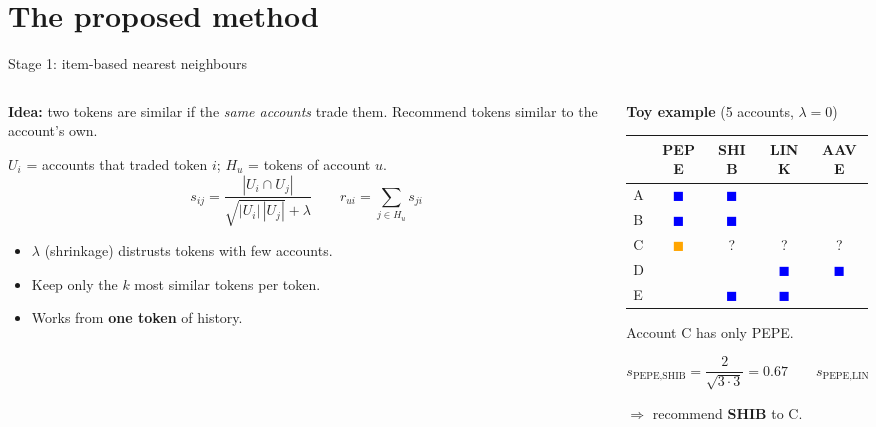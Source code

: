 \documentclass[aspectratio=169,10pt]{beamer}
\begin{document}
\section{The proposed method}

\begin{frame}{Stage 1: item-based nearest neighbours \cite{sarwar2001}}
  \begin{columns}[T]
    \begin{column}{0.46\textwidth}
      \small
      \textbf{Idea:} two tokens are similar if the \emph{same accounts} trade them.
      Recommend tokens similar to the account's own.
      \par\smallskip
      $U_i$ = accounts that traded token $i$; $H_u$ = tokens of account $u$.
      \[
        s_{ij} = \frac{|U_i \cap U_j|}{\sqrt{|U_i|\,|U_j|} + \lambda}
        \qquad
        r_{ui} = \sum_{j \in H_u} s_{ji}
      \]
      \begin{itemize}\footnotesize
        \item $\lambda$ (shrinkage) distrusts tokens with few accounts.
        \item Keep only the $k$ most similar tokens per token.
        \item Works from \textbf{one token} of history.
      \end{itemize}
    \end{column}
    \begin{column}{0.5\textwidth}
      \centering\footnotesize
      \textbf{Toy example} (5 accounts, $\lambda=0$)
      \par\smallskip
      \begin{tabular}{@{}lcccc@{}}
        \toprule
        & PEPE & SHIB & LINK & AAVE \\
        \midrule
        A & \textcolor{blue}{$\blacksquare$} & \textcolor{blue}{$\blacksquare$} & & \\
        B & \textcolor{blue}{$\blacksquare$} & \textcolor{blue}{$\blacksquare$} & & \\
        C & \textcolor{orange}{$\blacksquare$} & ? & ? & ? \\
        D & & & \textcolor{blue}{$\blacksquare$} & \textcolor{blue}{$\blacksquare$} \\
        E & & \textcolor{blue}{$\blacksquare$} & \textcolor{blue}{$\blacksquare$} & \\
        \bottomrule
      \end{tabular}
      \par\medskip
      Account C has only PEPE.
      \par\smallskip
      $s_{\text{PEPE,SHIB}} = \dfrac{2}{\sqrt{3\cdot 3}} = 0.67 \qquad s_{\text{PEPE,LINK}} = 0$
      \par\smallskip
      $\Rightarrow$ recommend \textbf{SHIB} to C.
    \end{column}
  \end{columns}
\end{frame}
\end{document}
